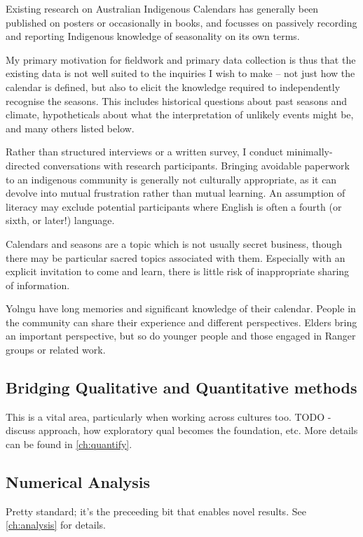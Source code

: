 Existing research on Australian Indigenous Calendars has generally been 
published on posters or occasionally in books, and focusses on passively 
recording and reporting Indigenous knowledge of seasonality on its own terms.  

My primary motivation for fieldwork and primary data collection is thus that 
the existing data is not well suited to the inquiries I wish to make – not just 
how the calendar is defined, but also to elicit the knowledge required to 
independently recognise the seasons.  This includes historical questions about 
past seasons and climate, hypotheticals about what the interpretation of 
unlikely events might be, and many others listed below.

Rather than structured interviews or a written survey, I conduct minimally-
directed conversations with research participants.  Bringing avoidable 
paperwork to an indigenous community is generally not culturally appropriate, 
as it can devolve into mutual frustration rather than mutual learning.  An 
assumption of literacy may exclude potential participants where English is 
often a fourth (or sixth, or later!) language.

Calendars and seasons are a topic which is not usually secret business, though 
there may be particular sacred topics associated with them.  Especially with an 
explicit invitation to come and learn, there is little risk of inappropriate 
sharing of information.

Yolngu have long memories and significant knowledge of their 
calendar.  People in the community can share their experience and different 
perspectives.  Elders bring an important perspective, but so do younger people 
and those engaged in Ranger groups or related work.


\subsection{Bridging Qualitative and Quantitative methods}
This is a vital area, particularly when working across cultures too.
TODO - discuss approach, how exploratory qual becomes the foundation,
etc.  More details can be found in \autoref{ch:quantify}.


\subsection{Numerical Analysis}
Pretty standard; it's the preceeding bit that enables novel results.
See \autoref{ch:analysis} for details.






